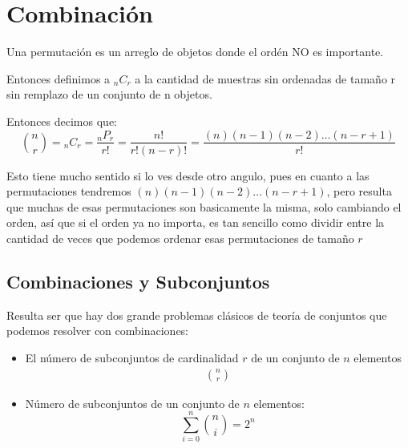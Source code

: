 \documentclass[12pt, fleqn]{report}                             %
\theoremstyle{break}                                            %
\begin{document}
        \section{Combinación}

            Una permutación es un arreglo de objetos donde el ordén NO es importante. 

            Entonces definimos a ${}_nC_r$ a la cantidad de muestras sin ordenadas de tamaño r sin remplazo
            de un conjunto de n objetos.

            Entonces decimos que:
            \begin{equation*}
                {n \choose r}
                = {}_nC_r 
                = \dfrac{{}_nP_r}{r!}          
                = \dfrac{n!}{r!(n-r)!}          
                = \dfrac{(n)(n-1)(n-2)\dots(n-r+1)}{r!}
            \end{equation*}

            Esto tiene mucho sentido si lo ves desde otro angulo, pues en cuanto a las permutaciones
            tendremos $(n)(n-1)(n-2)\dots(n-r+1)$, pero resulta que muchas de esas permutaciones son
            basicamente la misma, solo cambiando el orden, así que si el orden ya no importa, es tan sencillo
            como dividir entre la cantidad de veces que podemos ordenar esas permutaciones de tamaño $r$


            \vspace{1em}
            \subsection{Combinaciones y Subconjuntos}

                Resulta ser que hay dos grande problemas clásicos de teoría de conjuntos
                que podemos resolver con combinaciones:
                \begin{itemize}
                    \item 
                        El número de subconjuntos de cardinalidad $r$ de un conjunto de $n$ elementos
                        \begin{align*}
                            {n \choose r}
                        \end{align*}

                    \item
                        Número de subconjuntos de un conjunto de $n$ elementos:
                        \begin{equation*}
                            \sum_{i = 0}^n {n \choose i} = 2^n
                        \end{equation*}
                \end{itemize}
\end{document}
